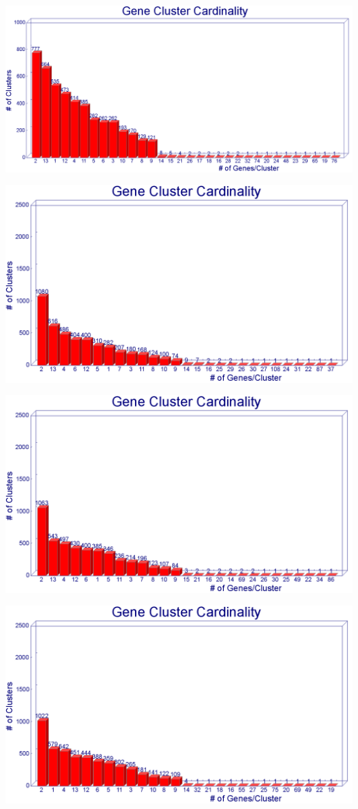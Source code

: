 \documentclass[11pt,notitlepage]{article}
\begin{document}
  \includegraphics[width=145mm]{i60_a90_graph.png}
  
  \includegraphics[width=145mm]{i75_a50_graph.png}
  
  \includegraphics[width=145mm]{i75_a70_graph.png}
  
  \includegraphics[width=145mm]{i75_a90_graph.png}
  
\end{document}
